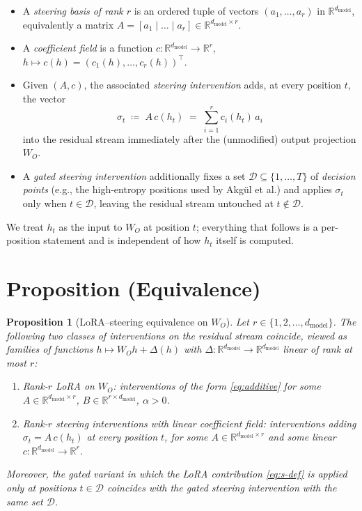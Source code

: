 \documentclass[11pt]{article}
\newtheorem{proposition}{Proposition}
\begin{document}
\begin{itemize}
\item A \emph{steering basis of rank $r$} is an ordered tuple of vectors $(a_1, \dots, a_r)$ in $\mathbb{R}^{d_{\mathrm{model}}}$, equivalently a matrix $A = [a_1 \mid \dots \mid a_r] \in \mathbb{R}^{d_{\mathrm{model}}\times r}$.
\item A \emph{coefficient field} is a function $c: \mathbb{R}^{d_{\mathrm{model}}} \to \mathbb{R}^r$, $h \mapsto c(h) = (c_1(h), \dots, c_r(h))^\top$.
\item Given $(A, c)$, the associated \emph{steering intervention} adds, at every position $t$, the vector
\[
\sigma_t \;\coloneqq\; A\, c(h_t) \;=\; \sum_{i=1}^{r} c_i(h_t)\, a_i
\]
into the residual stream immediately after the (unmodified) output projection $W_O$.
\item A \emph{gated steering intervention} additionally fixes a set $\mathcal{D} \subseteq \{1, \dots, T\}$ of \emph{decision points} (e.g., the high-entropy positions used by Akg\"{u}l et al.) and applies $\sigma_t$ only when $t \in \mathcal{D}$, leaving the residual stream untouched at $t \notin \mathcal{D}$.
\end{itemize}

We treat $h_t$ as the input to $W_O$ at position $t$; everything that follows is a per-position statement and is independent of how $h_t$ itself is computed.

\section*{Proposition (Equivalence)}

\begin{proposition}[LoRA--steering equivalence on $W_O$]
\label{prop:equiv}
Let $r \in \{1, 2, \dots, d_{\mathrm{model}}\}$. The following two classes of interventions on the residual stream coincide, viewed as families of functions $h \mapsto W_O h + \Delta(h)$ with $\Delta : \mathbb{R}^{d_{\mathrm{model}}} \to \mathbb{R}^{d_{\mathrm{model}}}$ linear of rank at most $r$:
\begin{enumerate}
\item[\textup{(a)}] \emph{Rank-$r$ LoRA on $W_O$:} interventions of the form \eqref{eq:additive} for some $A \in \mathbb{R}^{d_{\mathrm{model}}\times r}$, $B \in \mathbb{R}^{r \times d_{\mathrm{model}}}$, $\alpha > 0$.
\item[\textup{(b)}] \emph{Rank-$r$ steering interventions with linear coefficient field:} interventions adding $\sigma_t = A\, c(h_t)$ at every position $t$, for some $A \in \mathbb{R}^{d_{\mathrm{model}}\times r}$ and some linear $c : \mathbb{R}^{d_{\mathrm{model}}} \to \mathbb{R}^r$.
\end{enumerate}
Moreover, the gated variant in which the LoRA contribution \eqref{eq:s-def} is applied only at positions $t \in \mathcal{D}$ coincides with the gated steering intervention with the same set $\mathcal{D}$.
\end{proposition}
\end{document}
